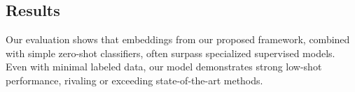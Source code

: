 \subsection{Results}
Our evaluation shows that embeddings from our proposed framework, combined with simple zero-shot classifiers, often surpass specialized supervised models. Even with minimal labeled data, our model demonstrates strong low-shot performance, rivaling or exceeding state-of-the-art methods.
